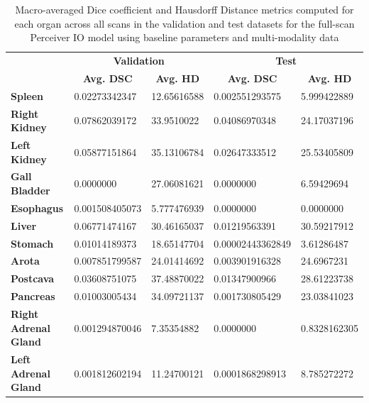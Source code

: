 \documentclass{l4proj}
\begin{document}
\begin{table}[]
\caption{Macro-averaged Dice coefficient and Hausdorff Distance metrics computed for each organ across all scans in the validation and test datasets for the full-scan Perceiver IO model using baseline parameters and multi-modality data} \label{tab:full_scan_test}
\begin{tabular}{lllll}
                             & \multicolumn{2}{c}{\textbf{Validation}}                                      & \multicolumn{2}{c}{\textbf{Test}}                                            \\
\textbf{}                    & \multicolumn{1}{c}{\textbf{Avg. DSC}} & \multicolumn{1}{c}{\textbf{Avg. HD}} & \multicolumn{1}{c}{\textbf{Avg. DSC}} & \multicolumn{1}{c}{\textbf{Avg. HD}} \\
\textbf{Spleen}              & \num{0.02273342347} & \num{12.65616588} & \num{0.002551293575} & \num{5.999422889} \\
\textbf{Right Kidney}        & \num{0.07862039172} & \num{33.9510022} & \num{0.04086970348} & \num{24.17037196} \\
\textbf{Left Kidney}         & \num{0.05877151864} & \num{35.13106784} & \num{0.02647333512} & \num{25.53405809} \\
\textbf{Gall Bladder}        & \num{0.0000000} & \num{27.06081621} & \num{0.0000000} & \num{6.59429694} \\
\textbf{Esophagus}           & \num{0.001508405073} & \num{5.777476939} & \num{0.0000000} & \num{0.0000000} \\
\textbf{Liver}               & \num{0.06771474167} & \num{30.46165037} & \num{0.01219563391} & \num{30.59217912} \\
\textbf{Stomach}             & \num{0.01014189373} & \num{18.65147704} & \num{0.00002443362849} & \num{3.61286487} \\
\textbf{Arota}               & \num{0.007851799587} & \num{24.01414692} & \num{0.003901916328} & \num{24.6967231} \\
\textbf{Postcava}            & \num{0.03608751075} & \num{37.48870022} & \num{0.01347900966} & \num{28.61223738} \\
\textbf{Pancreas}            & \num{0.01003005434} & \num{34.09721137} & \num{0.001730805429} & \num{23.03841023} \\
\textbf{Right Adrenal Gland} & \num{0.001294870046} & \num{7.35354882} & \num{0.0000000} & \num{0.8328162305} \\
\textbf{Left Adrenal Gland}  & \num{0.001812602194} & \num{11.24700121} & \num{0.0001868298913} & \num{8.785272272} \\

\end{tabular}
\end{table}
\end{document}
